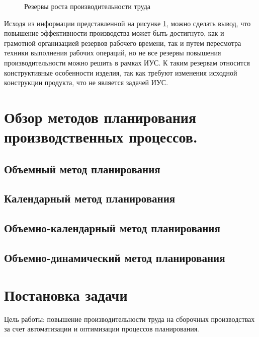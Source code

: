 \begin{figure}[H]
    \caption{Резервы роста производительности труда}
    \label{ris:reserve1}
\end{figure}

Исходя из информации представленной на рисунке \ref{ris:reserve1}, можно сделать вывод, что повышение эффективности производства может быть достигнуто, как и грамотной организацией резервов рабочего времени, так и путем пересмотра техники выполнения рабочих операций, но не все резервы повышения производительности можно решить в рамках ИУС. К таким резервам относится конструктивные особенности изделия, так как требуют изменения исходной конструкции продукта, что не является задачей ИУС. 

\section{Обзор методов планирования производственных процессов.}
\subsection{Объемный метод планирования}
\subsection{Календарный метод планирования}
\subsection{Объемно-календарный метод планирования}
\subsection{Объемно-динамический метод планирования}
\section{Постановка задачи}
Цель работы: повышение производительности труда на сборочных производствах за счет автоматизации и оптимизации процессов планирования.

